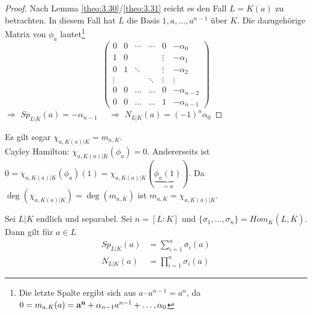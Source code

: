 \documentclass[../main.tex]{subfiles}
\begin{document}
\begin{proof}
    Nach Lemma \ref{theo:3.30}/\ref{theo:3.31} reicht es den Fall $L=K(a)$ zu betrachten.
    In diesem Fall hat $L$ die Basis $1,a,\dots,a^{n-1}$ über $K$.
    Die dazugehörige Matrix von $\phi_a$ lautet\footnote{Die letzte Spalte ergibt sich aus $a\cdot a^{n-1} = a^n$, da $0=m_{a,K}(a) = \bold{a^n} + \alpha_{n-1} a^{n-1}+\dots,\alpha_0$}
    $$\begin{pmatrix}
        0& 0 &\cdots &\cdots & 0 & -\alpha_0\\
        1& 0 & &  & \vdots& -\alpha_1\\
        0& 1 & \ddots && \vdots&-\alpha_2\\
        \vdots&&  &\ddots&\vdots&\vdots\\
        0&0& \dots& \dots &0& -\alpha_{n-2}\\
        0&0&\dots & \dots& 1   &    -\alpha_{n-1}
    \end{pmatrix}$$
    $\Rightarrow$ $Sp_{L|K}(a) = -\alpha_{n-1}\quad$%
    $\Rightarrow$ $N_{L|K} (a) = (-1)^n \alpha_0$
\end{proof}
\begin{remark}
    Es gilt sogar $\chi_{a,K(a)|K} = m_{a,K}$.\\
    Cayley Hamilton:
    $\chi_{a,K(a)|K}(\phi_a) = 0$.
    Andererseits ist $0=\chi_{a,K(a)|K}(\phi_a)(1) = \chi_{a,K(a)|K}(\underbrace{\phi_a(1)}_{=a}) $. Da $\deg(\chi_{a,K(a)|K})=\deg(m_{a,K})$ ist $m_{a,K} = \chi_{a,K(a)|K}$.
\end{remark}

\begin{theorem}
    Sei $L|K$ endlich und separabel.
    Sei $n=[L:K]$ und $\{\sigma_1,\dots,\sigma_n\} = Hom_K(L,\overline{K})$.
    Dann gilt für $a\in L$
    \begin{align*}
        Sp_{L|K} (a) &= \sum_{i=1}^n \sigma_i(a)\\
        N_{L|K} (a) &= \prod_{i=1}^n \sigma_i(a)
    \end{align*}
\end{theorem}
\end{document}
